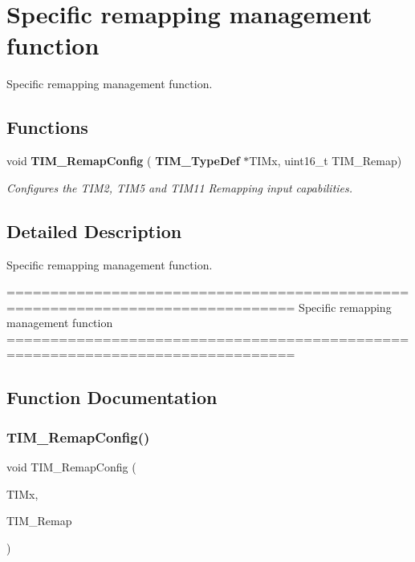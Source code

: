 \section{Specific remapping management function}
\label{group__TIM__Group9}


Specific remapping management function.  


\subsection*{Functions}
\begin{DoxyCompactItemize}
\item 
void \textbf{ T\+I\+M\+\_\+\+Remap\+Config} (\textbf{ T\+I\+M\+\_\+\+Type\+Def} $\ast$T\+I\+Mx, uint16\+\_\+t T\+I\+M\+\_\+\+Remap)
\begin{DoxyCompactList}\small\item\em Configures the T\+I\+M2, T\+I\+M5 and T\+I\+M11 Remapping input capabilities. \end{DoxyCompactList}\end{DoxyCompactItemize}


\subsection{Detailed Description}
Specific remapping management function. 

\begin{DoxyVerb} ===============================================================================
                     Specific remapping management function
 ===============================================================================  \end{DoxyVerb}
 

\subsection{Function Documentation}
\mbox{\label{group__TIM__Group9_ga08ffb6f2bfa96b6fbcbb8d8001cb8ba9}} 
\subsubsection{T\+I\+M\+\_\+\+Remap\+Config()}
{\footnotesize\ttfamily void T\+I\+M\+\_\+\+Remap\+Config (\begin{DoxyParamCaption}\item[{\textbf{ T\+I\+M\+\_\+\+Type\+Def} $\ast$}]{T\+I\+Mx,  }\item[{uint16\+\_\+t}]{T\+I\+M\+\_\+\+Remap }\end{DoxyParamCaption})}




